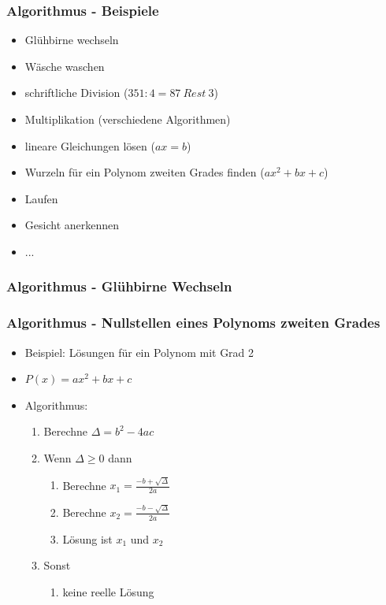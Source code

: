 \documentclass{beamer}
\begin{document}
	\begin{frame}
		\frametitle{Algorithmus - Beispiele}
		\pause
		\begin{itemize}
			\item Glühbirne wechseln
			\item Wäsche waschen
			\pause
			\vspace{10pt}
			\item schriftliche Division ($351 : 4 = 87\ Rest\ 3$)
			\item Multiplikation (verschiedene Algorithmen)
			\item lineare Gleichungen lösen ($ax = b$)
			\item Wurzeln für ein Polynom zweiten Grades finden ($ax^2 + bx + c$)
			\pause
			\vspace{10pt}
			\item Laufen
			\item Gesicht anerkennen
			\item ...
		\end{itemize}
	\end{frame}

	\begin{frame}
		\frametitle{Algorithmus - Glühbirne Wechseln}
		
	\end{frame}

	\begin{frame}
		\frametitle{Algorithmus - Nullstellen eines Polynoms zweiten Grades}
		\begin{itemize}
			\item Beispiel: Lösungen für ein Polynom mit Grad 2
			\item $P(x) = ax^2 + bx + c$
			\pause
			\vspace{10pt}
			\item Algorithmus:
			\begin{enumerate}
				\item Berechne $\Delta = b^2 - 4ac$
				\item Wenn $\Delta \ge 0$ dann
				\begin{enumerate}
					\item Berechne $x_1 = \frac{-b + \sqrt{\Delta}}{2a}$
					\item Berechne $x_2 = \frac{-b - \sqrt{\Delta}}{2a}$
					\item Lösung ist $x_1$ und $x_2$
				\end{enumerate}
				\item Sonst
				\begin{enumerate}
					\item keine reelle Lösung
				\end{enumerate}
			\end{enumerate}
		\end{itemize}
	\end{frame}
\end{document}
